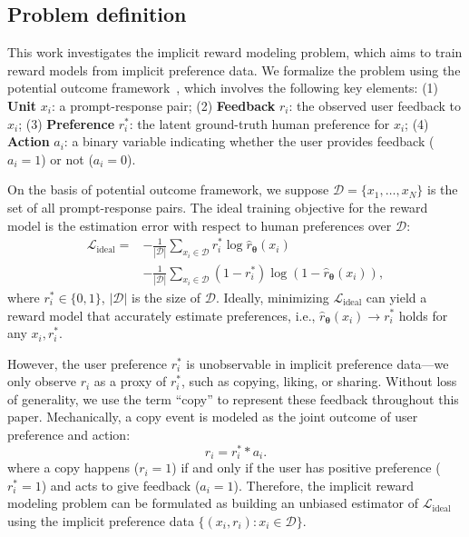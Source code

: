 \documentclass[]{arxiv_singlecolumn}
\theoremstyle{plain}
\theoremstyle{definition}
\theoremstyle{remark}
\begin{document}
\subsection{Problem definition}\label{sec:problem}

This work investigates the implicit reward modeling problem, which aims to train reward models from implicit preference data. We formalize the problem using the potential outcome framework~\citep{wang2025toiswbm}, which involves the following key elements: (1) \textbf{Unit} $x_i$: a prompt-response pair; (2) \textbf{Feedback} $r_i$: the observed user feedback to $x_i$; (3) \textbf{Preference} $r^*_i$: the latent ground-truth human preference for $x_i$; (4) \textbf{Action} $a_i$: a binary variable indicating whether the user provides feedback ($a_i=1$) or not ($a_i=0$).

On the basis of potential outcome framework, we suppose $\mathcal{D} = \{x_1, \dots, x_N\}$ is the set of all prompt-response pairs. The ideal training objective for the reward model is the estimation error with respect to human preferences over $\mathcal{D}$:
\begin{equation}
\begin{aligned}
    \mathcal{L}_\mathrm{ideal} = &-\frac{1}{\left|\mathcal{D}\right|} \sum_{x_i\in\mathcal{D}} r^*_i\log\hat{r}_{\mathbf{\theta}}(x_i)\\
    &-\frac{1}{\left|\mathcal{D}\right|} \sum_{x_i\in\mathcal{D}} \left(1-r^*_i\right)\log\left(1-\hat{r}_{\mathbf{\theta}}(x_i)\right),
\end{aligned}
    \label{eq:ideal_loss}
\end{equation}
where $r^*_i\in\{0,1\}$, $\left|\mathcal{D}\right|$ is the size of $\mathcal{D}$. Ideally, minimizing $\mathcal{L}_{\mathrm{ideal}}$ can yield a reward model that accurately estimate preferences, i.e.,  $\hat{r}_{\mathbf{\theta}}(x_i)\rightarrow r^*_i$ holds for any $x_i,r_i^*$.

However, the user preference $r^*_i$ is unobservable in implicit preference data---we only observe $r_i$ as a proxy of $r^*_i$, such as copying, liking, or sharing. Without loss of generality, we use the term ``copy'' to represent these feedback throughout this paper. Mechanically, a copy event is modeled as the joint outcome of user preference and action:
\begin{equation}\label{eq:r}
    r_i=r^*_i * a_i.
\end{equation}
where a copy happens ($r_i=1$) if and only if the user has positive preference ($r^*_i=1$) and acts to give feedback ($a_i=1$). Therefore, the implicit reward modeling problem can be formulated as building an unbiased estimator of $\mathcal{L}_\mathrm{ideal}$ using the implicit preference data $\{(x_i, r_i): x_i \in \mathcal{D}\}$.
\end{document}
